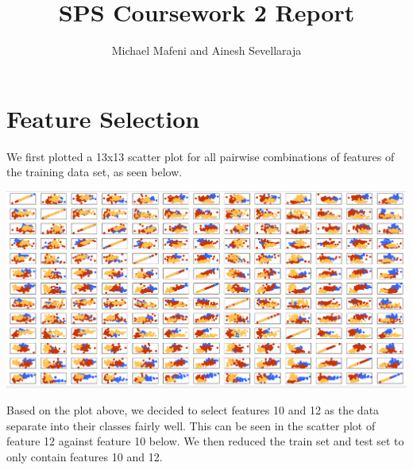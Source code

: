 \documentclass[11pt]{article}
\begin{document}
\title{SPS Coursework 2 Report}
\author{Michael Mafeni and Ainesh Sevellaraja}
\date{}
\maketitle

\section{Feature Selection}
We first plotted a 13x13 scatter plot for all pairwise combinations of features of the training data set, as seen below.

  
\begin{center}
\includegraphics[scale=0.25]{feature_selection}
\end{center}

Based on the plot above, we decided to select features 10 and 12 as the data separate into their classes fairly well. This can be seen in the scatter plot of feature 12 against feature 10 below. We then reduced the train set and test set to only contain features 10 and 12.
\end{document}
